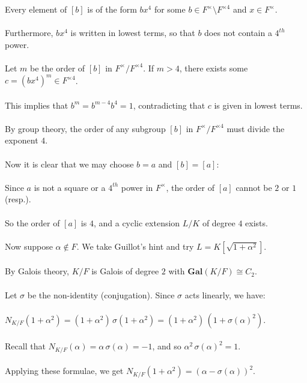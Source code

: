 \documentclass{article}
\begin{document}
\indent \indent Every element of $[b]$ is of the form $bx^{4}$ for some $b \in F^\times{\setminus}F^{\times4}$ and $x \in F^\times$. \\\\
\indent \indent Furthermore, $bx^4$ is written in lowest terms, so that $b$ does not contain a $4^{th}$ power. \\\\
\indent \indent Let $m$ be the order of $[b]$ in $F^\times/F^{\times4}$.  If $m > 4$,  there exists some $c = (bx^{4})^m \in F^{\times 4}$. \\\\
\indent \indent This implies that $b^m = b^{m-4}b^4 = 1$, contradicting that $c$ is given in lowest terms. \\\\
\indent By group theory, the order of any subgroup $[b]$ in $F^\times/F^{\times4}$ must divide the exponent $4$. \\\\
\indent Now it is clear that we may choose $b = a$ and $[b] = [a]$: \\\\
\indent \indent Since $a$ is not a square or a $4^{th}$ power in $F^\times$, the order of $[a]$ cannot be $2$ or $1$ (resp.). \\\\
\indent \indent So the order of $[a]$ is $4$, and a cyclic extension $L/K$ of degree $4$ exists. \\\\
Now suppose $\alpha \notin F$. We take Guillot's hint and try $L = K[\sqrt{1+\alpha^2}]$. \\\\
\indent By Galois theory, $K/F$ is Galois of degree $2$ with $\textbf{Gal}(K/F) \cong C_2$. \\\\
\indent Let $\sigma$ be the non-identity (conjugation). Since $\sigma$ acts linearly, we have: \\\\
\indent \indent $N_{K/F}(1 + \alpha^2) = (1 + \alpha^2) \, \sigma(1 + \alpha^2) = (1 + \alpha^2) \, (1 + \sigma(\alpha)^2).$ \\\\
\indent Recall that $N_{K/F}(\alpha) = \alpha \, \sigma(\alpha) = -1$, and so $\alpha^2 \, \sigma(\alpha)^2 = 1$. \\\\
\indent Applying these formulae, we get $N_{K/F}(1 + \alpha^2) = (\alpha - \sigma(\alpha))^2$. \\\\
\end{document}
